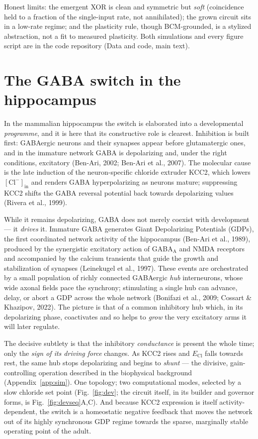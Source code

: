 \documentclass[11pt,a4paper]{article}
\newcommand{\Clm}{\mathrm{Cl}^{-}}
\newcommand{\ECl}{E_{\mathrm{Cl}}}
\begin{document}
Honest limits: the emergent XOR is clean and symmetric but \emph{soft} (coincidence held to a fraction of the single-input rate, not annihilated); the grown circuit sits in a low-rate regime; and the plasticity rule, though BCM-grounded, is a stylized abstraction, not a fit to measured plasticity. Both simulations and every figure script are in the code repository (Data and code, main text).


\FloatBarrier
\section{The GABA switch in the hippocampus}\label{app:hipp}
In the mammalian hippocampus the switch is elaborated into a developmental \emph{programme}, and it is here that its constructive role is clearest. Inhibition is built first: GABAergic neurons and their synapses appear before glutamatergic ones, and in the immature network GABA is depolarizing and, under the right conditions, excitatory (Ben-Ari, 2002; Ben-Ari et al., 2007). The molecular cause is the late induction of the neuron-specific chloride extruder KCC2, which lowers $[\Clm]_{\mathrm{in}}$ and renders GABA hyperpolarizing as neurons mature; suppressing KCC2 shifts the GABA reversal potential back towards depolarizing values (Rivera et al., 1999).

While it remains depolarizing, GABA does not merely coexist with development --- it \emph{drives} it. Immature GABA generates Giant Depolarizing Potentials (GDPs), the first coordinated network activity of the hippocampus (Ben-Ari et al., 1989), produced by the synergistic excitatory action of GABA$_{\mathrm{A}}$ and NMDA receptors and accompanied by the calcium transients that guide the growth and stabilization of synapses (Leinekugel et al., 1997). These events are orchestrated by a small population of richly connected GABAergic \emph{hub} interneurons, whose wide axonal fields pace the synchrony; stimulating a single hub can advance, delay, or abort a GDP across the whole network (Bonifazi et al., 2009; Cossart \& Khazipov, 2022). The picture is that of a common inhibitory hub which, in its depolarizing phase, coactivates and so helps to \emph{grow} the very excitatory arms it will later regulate.

The decisive subtlety is that the inhibitory \emph{conductance} is present the whole time; only the \emph{sign of its driving force} changes. As KCC2 rises and $\ECl$ falls towards rest, the same hub stops depolarizing and begins to \emph{shunt} --- the divisive, gain-controlling operation described in the biophysical background (Appendix~\ref{app:sim}). One topology; two computational modes, selected by a slow chloride set point (Fig.~\ref{fig:dev}; the circuit itself, in its builder and governor forms, is Fig.~\ref{fig:devseq}A,C). And because KCC2 expression is itself activity-dependent, the switch is a homeostatic negative feedback that moves the network out of its highly synchronous GDP regime towards the sparse, marginally stable operating point of the adult.
\end{document}
